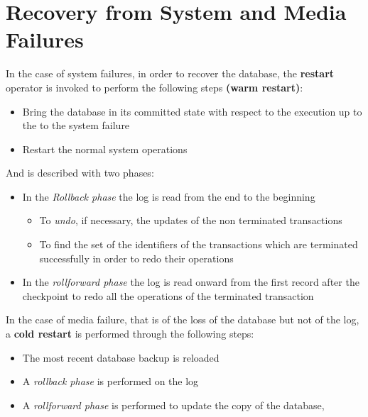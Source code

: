 \section{Recovery from System and Media Failures}
In the case of system failures, in order to recover the database, the \textbf{restart} operator is invoked to perform the following steps \textbf{(warm restart)}:
\begin{itemize}
    \item Bring the database in its committed state with respect to the execution up to the to the system failure
    \item Restart the normal system operations
\end{itemize}
And is described with two phases:
\begin{itemize}
    \item In the \textit{Rollback phase} the log is read from the end to the beginning
    \begin{itemize}
        \item To \textit{undo}, if necessary, the updates of the non terminated transactions
        \item To find the set of the identifiers of the transactions which are terminated successfully in order to redo their operations
    \end{itemize}
    \item In the \textit{rollforward phase} the log is read onward from the first record after the checkpoint to redo all the operations of the terminated transaction
\end{itemize}

In the case of media failure, that is of the loss of the database but not of the log, a \textbf{cold restart} is performed through the following steps:
\begin{itemize}
    \item The most recent database backup is reloaded
    \item A \textit{rollback phase} is performed on the log
    \item A \textit{rollforward phase} is performed to update the copy of the database,
\end{itemize}